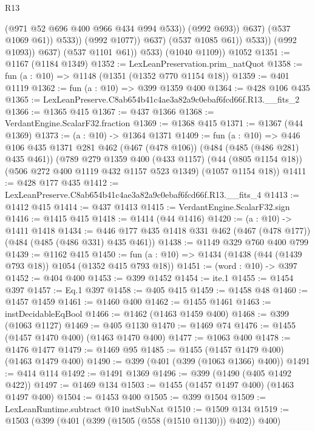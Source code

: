 \begin{lexlean}{R13}
\begin{coremodule}
                                    (@971 @52 @696 @400 @966 @434 @994 @533))
                                  (@992 @693))
                                @637)
                              (@537 @1069 @61))
                            @533))
                        (@992 @1077))
                      @637)
                    (@537 @1085 @61))
                  @533))
              (@992 @1093))
            @637)
          (@537 @1101 @61))
        @533)
      (@1040 @1109))
    @1052
@1351 := @1167 (@1184 @1349)
@1352 := LexLeanPreservation.prim_natQuot
@1358 := fun (a : @10) => @1148 (@1351 (@1352 @770 @1154 @18))
@1359 := @401 @1119
@1362 := fun (a : @10) => @399 @1359 @400
@1364 := @428 @106 @435
@1365 := LexLeanPreserve.C8ab654b41c4ae3a82a9c0ebaf6fcd66f.R13.__fits_2
@1366 := @1365 @415
@1367 := @437 @1366
@1368 := VerdantEngine.ScalarF32.fraction
@1369 := @1368 @415
@1371 := @1367 (@44 @1369)
@1373 := (a : @10) -> @1364 @1371
@1409 := fun (a : @10) =>
  @446
    @106
    @435
    @1371
    @281
    @462
    (@467 (@478 @106))
    (@484 (@485 (@486 @281) @435 @461))
    (@789
      @279
      @1359
      @400
      (@433 @1157)
      (@44 (@805 @1154 @18))
      (@506 @272 @400 @1119 @432 @1157 @523 @1349)
      (@1057 @1154 @18))
@1411 := @428 @177 @435
@1412 := LexLeanPreserve.C8ab654b41c4ae3a82a9c0ebaf6fcd66f.R13.__fits_4
@1413 := @1412 @415
@1414 := @437 @1413
@1415 := VerdantEngine.ScalarF32.sign
@1416 := @1415 @415
@1418 := @1414 (@44 @1416)
@1420 := (a : @10) -> @1411 @1418
@1434 := @446 @177 @435 @1418 @331 @462 (@467 (@478 @177)) (@484 (@485 (@486 @331) @435 @461))
@1438 := @1149 @329 @760 @400 @799
@1439 := @1162 @415
@1450 := fun (a : @10) => @1434 (@1438 (@44 (@1439 @793 @18)) @1054 (@1352 @415 @793 @18))
@1451 := (word : @10) -> @397
@1452 := @404 @400
@1453 := @399 @1452
@1454 := ite.{1}
@1455 := @1454 @397
@1457 := Eq.{1} @397
@1458 := @405 @415
@1459 := @1458 @48
@1460 := @1457 @1459
@1461 := @1460 @400
@1462 := @1455 @1461
@1463 := instDecidableEqBool
@1466 := @1462 (@1463 @1459 @400)
@1468 := @399 (@1063 @1127)
@1469 := @405 @1130
@1470 := @1469 @74
@1476 := @1455 (@1457 @1470 @400) (@1463 @1470 @400)
@1477 := @1063 @400
@1478 := @1476 @1477
@1479 := @1469 @95
@1485 := @1455 (@1457 @1479 @400) (@1463 @1479 @400)
@1490 := @399 (@401 (@399 (@1063 @1366) @400))
@1491 := @414 @114
@1492 := @1491 @1369
@1496 := @399 (@1490 (@405 @1492 @422))
@1497 := @1469 @134
@1503 := @1455 (@1457 @1497 @400) (@1463 @1497 @400)
@1504 := @1453 @400
@1505 := @399 @1504
@1509 := LexLeanRuntime.subtract @10 instSubNat
@1510 := @1509 @134
@1519 := @1503 (@399 (@401 (@399 (@1505 (@558 (@1510 @1130))) @402)) @400)

\end{coremodule}
\end{lexlean}
